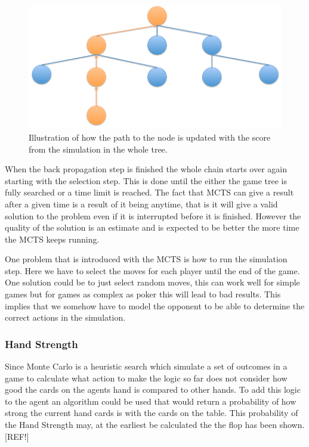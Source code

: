 \documentclass[journal]{vgtc}                %
\begin{document}
\begin{figure}[here]
  \begin{center}
    \includegraphics[scale=0.28]{img/tree2.png}
    \caption{\label{fig:backprop} Illustration of how the path to the node is updated with the score from the simulation in the whole tree.}
  \end{center}
\end{figure}
When the back propagation step is finished the whole chain starts over again starting with the selection step. This is done until the either the game tree is fully searched or a time limit is reached. The fact that MCTS can give a result after a given time is a result of it being anytime, that is it will give a valid solution to the problem even if it is interrupted before it is finished. However the quality of the solution is an estimate and is expected to be better the more time the MCTS keeps running.

One problem that is introduced with the MCTS is how to run the simulation step. Here we have to select the moves for each player until the end of the game. One solution could be to just select random moves, this can work well for simple games but for games as complex as poker this will lead to bad results. This implies that we somehow have to model the opponent to be able to determine the correct actions in the simulation.  

\subsubsection{Hand Strength}
Since Monte Carlo is a heuristic search which simulate a set of outcomes in a game to calculate what action to make the logic so far does not consider how good  the cards on the agents hand is compared to other hands. To add this logic to the agent an algorithm could be used that would return a probability of how strong the current hand cards is with the cards on the table. This probability of the Hand Strength may, at the earliest be calculated the the flop has been shown. [REF!]
\end{document}
